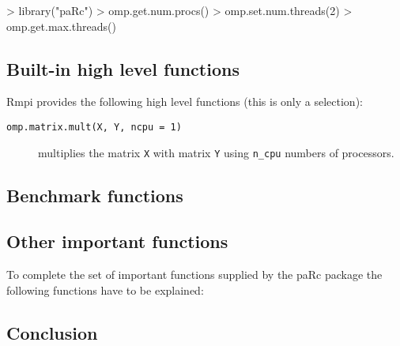 \begin{Schunk}
\begin{Sinput}
> library("paRc")
> omp.get.num.procs()
> omp.set.num.threads(2)
> omp.get.max.threads()
\end{Sinput}
\end{Schunk}

\subsection{Built-in high level functions}

Rmpi provides the following high level functions (this is only a selection): 

\begin{description}
\item[\texttt{omp.matrix.mult(X, Y, ncpu = 1)}] multiplies the matrix
  \texttt{X} with matrix \texttt{Y} using \texttt{n_cpu} numbers of
  processors.
\end{description}


\subsection{Benchmark functions}

\subsection{Other important functions}

To complete the set of important functions supplied by the paRc
package the following functions have to be explained:

\subsection{Conclusion}


